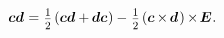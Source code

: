 \nopagebreak\vspace{-0.6em}\begin{equation}\label{symmetricantisymmetricdecompositionofdyad}
\hspace*{1em} \bm{c}\bm{d} \hspace{.1ex} = \hspace{.1ex}
\smalldisplaystyleonehalf \hspace{-0.1ex} \left( \bm{c}\bm{d} + \hspace{-0.1ex} \bm{d}\bm{c} \hspace{.1ex} \right)
- \hspace{.16ex} \smalldisplaystyleonehalf \hspace{-0.1ex} \left( \bm{c} \hspace{-0.1ex} \times \hspace{-0.2ex} \bm{d} \hspace{.2ex} \right) \hspace{-0.1ex} \times \hspace{-0.25ex} \UnitDyad
\hspace{.1ex} .
\end{equation}
